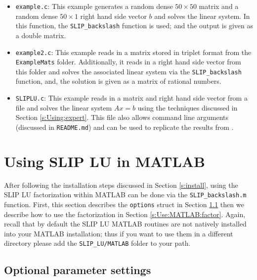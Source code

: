 \documentclass[12pt]{article}
\theoremstyle{definition}
\begin{document}
\begin{itemize}
\item \verb|example.c|: This example generates a random dense $50 \times 50$
matrix and a random dense $50 \times 1$ right hand side vector $b$ and
solves the linear system. In this function, the \verb|SLIP_backslash|
function is used; and the output is given as a double matrix.

\item \verb|example2.c|: This example reads in a matrix stored in triplet
format from the \verb|ExampleMats| folder. Additionally, it reads in a
right hand side vector from this folder and solves the associated linear system
via the \verb|SLIP_backslash| function, and, the solution is given as a matrix
of rational numbers.

\item \verb|SLIPLU.c|: This example reads in a matrix and right hand side
vector from a file and solves the linear system $A x = b$
using the techniques discussed in Section \ref{s:Using:expert}. This file also
allows command line arguments (discussed in \verb|README.md|) and can be used
to replicate the results from \cite{lourenco2019exact}.

\end{itemize}

\newpage
\cprotect\section{Using SLIP LU in MATLAB}
\label{s:Use:MATLAB}

After following the installation steps discussed in Section \ref{s:install},
using the SLIP LU factorization within MATLAB can be done via the
\verb|SLIP_backslash.m| function. First, this section describes the \verb|options|
struct in Section \ref{s:Use:MATLAB:setup} then we describe how to use the
factorization in Section \ref{s:Use:MATLAB:factor}.  Again, recall that by
default the SLIP LU MATLAB routines are not natively installed into your MATLAB
installation; thus if you want to use them in a different directory please add
the \verb|SLIP_LU/MATLAB| folder to your path.

\cprotect\subsection{Optional parameter settings}
\label{s:Use:MATLAB:setup}
\end{document}
